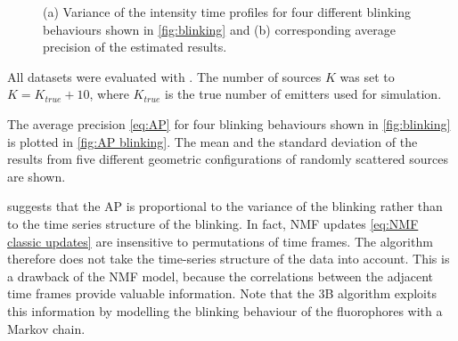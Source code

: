 \begin{figure}[!h]
	\centering
	\newcommand{\sizefig}{.40}
	\caption{(a) Variance of the intensity time profiles for four different blinking behaviours shown in \autoref{fig:blinking} and (b) corresponding average precision of the estimated results.}		
	\label{fig:variance and AP}
\end{figure}

All datasets were evaluated with \inmf{}. The number of sources $K$ was set to $K=K_{true}+10$, where $K_{true}$ is the true number of emitters used for simulation. 

The average precision \autoref{eq:AP} for four blinking behaviours shown in \autoref{fig:blinking} is plotted in \autoref{fig:AP blinking}. The mean and the standard deviation of the results from five different geometric configurations of randomly scattered sources are shown. 

 suggests that the AP is proportional to the variance of the blinking rather than to the time series structure of the blinking. In fact, NMF updates \autoref{eq:NMF classic updates} are insensitive to permutations of time frames. The \inmf{} algorithm therefore does not take the time-series structure of the data into account. This is a drawback of the NMF model, because the correlations between the adjacent time frames provide valuable information. Note that the 3B algorithm  \cite{Cox2011} exploits this information by modelling the blinking behaviour of the fluorophores with a Markov chain.


